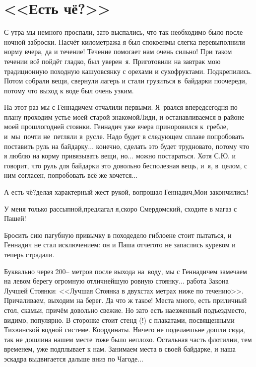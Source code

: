 \chapter{<<Есть чё?>>} 
\vepsianrose

С утра мы немного проспали, зато выспались, что так необходимо было после ночной заброски. Насчёт километража я был спокоен\mdash мы слегка перевыполнили норму вчера, да и течение! Течение помогает нам очень сильно! При таком течении всё пойдёт гладко, был уверен~я. Приготовили на завтрак мою традиционную походную кашу\mdash овсянку с орехами и сухофруктами. Подкрепились. Потом собрали вещи, свернули лагерь и стали грузиться в~байдарки по\sdash очереди, потому что выход к воде был очень узким. 

На этот раз мы с Геннадичем отчалили первыми. Я~рвался вперед\mdash  сегодня по плану проходим устье моей старой знакомой\mdash  Лиди, и останавливаемся в районе моей прошлогодней стоянки. Геннадич уже вчера приноровился к~гребле, и~мы~почти не~петляли в~русле. Надо будет в следующем сплаве попробовать поставить руль на байдарку$\ldots$ конечно, сделать это будет трудновато, потому что я люблю на корму привязывать вещи, но$\ldots$ можно постараться. Хотя С.Ю. и говорит, что руль для байдарки это довольно бесполезная вещь, и~я, в~целом, с ним согласен, попробовать всё же хочется$\ldots$ 

\diagdash А есть чё?\mdash делая характерный жест рукой, вопрошал Геннадич,\mdash Мои закончились!

\diagdash У меня только рассыпной,\mdash предлагал я,\mdash скоро Смердомский, сходите в магаз с Пашей!

Бросить сию пагубную привычку в походе\mdash дело гиблое\mdash не стоит пытаться, и Геннадич не стал исключением: он и Паша отчего\sdash то не запаслись куревом и теперь страдали.

Буквально через 200\thinspace\nobreakdash-- метров после выхода на~воду, мы с Геннадичем замечаем на левом берегу огромную отличнейшую ровную стоянку$\ldots$  работа Закона Лучшей Стоянки: <<Лучшая Стоянка в двухстах метрах ниже по течению>>. Причаливаем, выходим на берег. Да что ж такое! Места много, есть приличный стол, скамьи, причём довольно свежие. Но зато есть наезженный подъезд\mdash  место, видимо, популярно. В сторонке стоит стенд (!) с плакатами, посвященными Тихвинской водной системе. Координаты\mdash \CoordsChagodaGood. Ничего не поделаешь\mdash не дошли сюда, так не дошли\mdash на нашем месте тоже было неплохо. Остальная часть флотилии, тем временем, уже подплывает к нам. Занимаем места в своей байдарке, и наша эскадра выдвигается дальше вниз по Чагоде$\ldots$  

